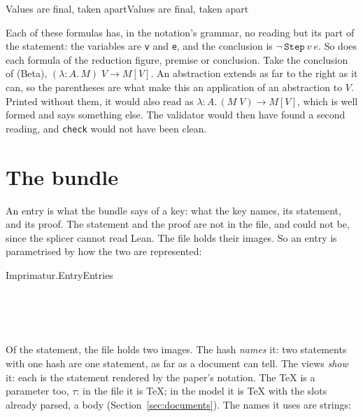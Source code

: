 \documentclass[acmsmall,screen,review,anonymous,nonacm]{acmart}
\begin{document}
\begin{leantheorem}[sum=WQ-WFxGWZX]{Values are final, taken apart}{Values are final, taken apart}
\label{thm:Values-are-final,-taken-apart}
\end{leantheorem}

\noindent Each of these formulas has, in the notation's grammar, no reading
but its part of the statement: the variables are \texttt{v} and
\texttt{e}, and the conclusion is $\neg\,\texttt{Step}\ v\ e$. So
does each formula of the reduction figure, premise or conclusion. Take the
conclusion of (Beta), $(\lambda{:}A.\, M)\; V \longrightarrow M[V]$. An
abstraction extends as far to the right as it can, so the parentheses are
what make this an application of an abstraction to $V$. Printed without
them, it would also read as
$\lambda{:}A.\, (M\; V) \longrightarrow M[V]$, which is well formed and
says something else. The validator would then have found a second reading,
and \texttt{check} would not have been clean.

\section{The bundle}\label{sec:bundle}

An entry is what the bundle says of a key: what the key names, its
statement, and its proof. The statement and the proof are not in the file,
and could not be, since the splicer cannot read Lean. The file holds their
images. So an entry is parametrised by how the two are represented:

\begin{leangrammar}[sum=y7VOO7qd76, dflt=UXRbK7fNW3]{Imprimatur.Entry}{Entries}
\label{gram:Imprimatur.Entry}\begin{LeanDisplay}
\\
\\
\\
\end{LeanDisplay}
\end{leangrammar}

Of the statement, the file holds two images. The hash \emph{names} it: two
statements with one hash are one statement, as far as a document can tell.
The views \emph{show} it: each is the statement rendered by the paper's
notation. The \TeX{} is a parameter too, $\tau$: in the file it is \TeX{};
in the model it is \TeX{} with the slots already parsed, a body
(Section~\ref{sec:documents}). The names it uses are strings:
\end{document}
